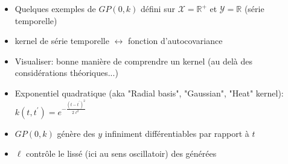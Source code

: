 \documentclass[xcolor=svgnames, t]{beamer}
\begin{document}
\begin{frame}{\subsecname}
  \begin{itemize}
    \item Quelques exemples de $GP(0, k)$ défini sur $\mathcal{X} = \mathbb{R}^+$ et $\mathcal{Y} = \mathbb{R}$
    (série temporelle)
    \item kernel de série temporelle $\leftrightarrow$ fonction d'autocovariance
    \item Visualiser: bonne manière de comprendre un kernel (au delà des considérations théoriques...)
  \end{itemize}  
\end{frame}

\begin{frame}{\subsecname}
  \begin{itemize}
    \item<1-> Exponentiel quadratique (aka "Radial basis", "Gaussian", "Heat" kernel):
    $k (t, t^\prime) = e^{- \frac{(t - t^\prime)^2}{2 \ell^2} }$
    \item<1-> $GP (0, k)$ génère des $y$ infiniment différentiables par rapport à $t$
    \item<1-> $\ell$ contrôle le lissé (ici au sens oscillatoir) des générées
  \end{itemize}
  \begin{figure}

\end{figure}
\end{frame}
\end{document}
